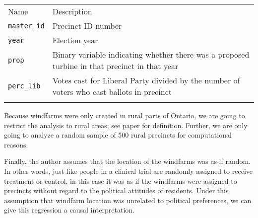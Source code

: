 \documentclass[]{article}
\begin{document}
\begin{longtable}[c]{@{}ll@{}}
\toprule\addlinespace
\begin{minipage}[b]{0.19\columnwidth}\raggedright
Name
\end{minipage} & \begin{minipage}[b]{0.75\columnwidth}\raggedright
Description
\end{minipage}
\\\addlinespace
\midrule\endhead
\begin{minipage}[t]{0.19\columnwidth}\raggedright
\texttt{master\_id}
\end{minipage} & \begin{minipage}[t]{0.75\columnwidth}\raggedright
Precinct ID number
\end{minipage}
\\\addlinespace
\begin{minipage}[t]{0.19\columnwidth}\raggedright
\texttt{year}
\end{minipage} & \begin{minipage}[t]{0.75\columnwidth}\raggedright
Election year
\end{minipage}
\\\addlinespace
\begin{minipage}[t]{0.19\columnwidth}\raggedright
\texttt{prop}
\end{minipage} & \begin{minipage}[t]{0.75\columnwidth}\raggedright
Binary variable indicating whether there was a proposed turbine in that
precinct in that year
\end{minipage}
\\\addlinespace
\begin{minipage}[t]{0.19\columnwidth}\raggedright
\texttt{perc\_lib}
\end{minipage} & \begin{minipage}[t]{0.75\columnwidth}\raggedright
Votes cast for Liberal Party divided by the number of voters who cast
ballots in precinct
\end{minipage}
\\\addlinespace
\bottomrule
\end{longtable}

Because windfarms were only created in rural parts of Ontario, we are
going to restrict the analysis to rural areas; see paper for definition.
Further, we are only going to analyze a random sample of 500 rural
precincts for computational reasons.

Finally, the author assumes that the location of the windfarms was as-if
random. In other words, just like people in a clinical trial are
randomly assigned to receive treatment or control, in this case it was
as if the windfarms were assigned to precincts without regard to the
political attitudes of residents. Under this assumption that windfarm
location was unrelated to political preferences, we can give this
regression a causal interpretation.
\end{document}
